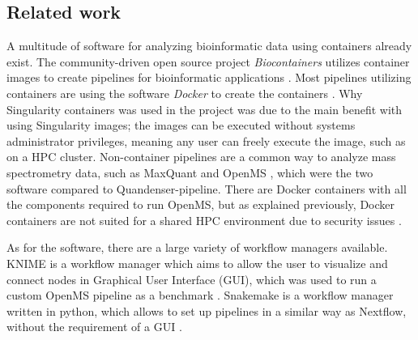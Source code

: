 \subsection{Related work}
A multitude of software for analyzing bioinformatic data using containers already exist. The community-driven open source project \textit{Biocontainers} utilizes container images to create pipelines for bioinformatic applications \cite{biocontainers}. Most pipelines utilizing containers are using the software \textit{Docker} to create the containers \cite{docker}. Why Singularity containers was used in the project was due to the main benefit with using Singularity images; the images can be executed without systems administrator privileges, meaning any user can freely execute the image, such as on a HPC cluster. Non-container pipelines are a common way to analyze mass spectrometry data, such as MaxQuant and OpenMS \cite{maxquant, openms}, which were the two software compared to Quandenser-pipeline. There are Docker containers with all the components required to run OpenMS, but as explained previously, Docker containers are not suited for a shared HPC environment due to security issues \cite{openms-hpc}.

As for the software, there are a large variety of workflow managers available. KNIME is a workflow manager which aims to allow the user to visualize and connect nodes in Graphical User Interface (GUI), which was used to run a custom OpenMS pipeline as a benchmark \cite{knime}. Snakemake is a workflow manager written in python, which allows to set up pipelines in a similar way as Nextflow, without the requirement of a GUI \cite{snakemake}.

